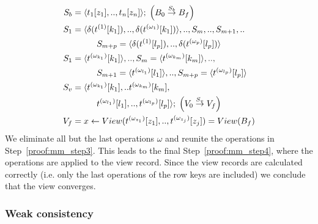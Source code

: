 \begin{subequations}
  \begin{align}
  S_b&=\langle t_1[z_1],..,t_n[z_n]\rangle;\;\Big(B_0 \overset{S_b}{\rightarrow}B_f\Big)\label{proof:mm_step1}\\ 
 S_1&=\langle \delta(t^{(1)}[k_{1}]),..,\delta(t^{(\omega_1)}[k_{1}])\rangle,..,S_m,..,S_{m+1},..\label{proof:mm_step2}\\ 
&\hspace{10 mm}S_{m+p}=\langle \delta(t^{(1)}[l_{p}]),..,\delta(t^{(\omega_p)}[l_{p}])\rangle\notag\\
  S_1&=\langle t^{(\omega_{k_1})}[k_{1}]\rangle,.., S_m=\langle t^{(\omega_{k_m})}[k_{m}]\rangle,..,\\
 &\hspace{10 mm}S_{m+1}=\langle t^{(\omega_{l_1})}[l_{1}]\rangle,..,S_{m+p}=\langle t^{(\omega_{l_p})}[l_{p}]\rangle\notag\\
 S_v&=\langle t^{(\omega_{k_1})}[k_{1}],..t^{(\omega_{k_m})}[k_{m}],\\
 &\hspace{10 mm}t^{(\omega_{l_1})}[l_{1}],..,t^{(\omega_{l_p})}[l_{p}] \rangle;\;\Big(V_0\overset{S_v}{\rightarrow}V_f\Big)\label{proof:mm_step3}\\
 	V_f&=x\leftarrow View(t^{(\omega_{z_1})}[z_1],.., t^{(\omega_{z_j})}[z_j])=View(B_f)\label{proof:mm_step4}
  \end{align}
\end{subequations}
%
We eliminate all but the last operations $\omega$ and reunite the 
operations in Step~\ref{proof:mm_step3}. This leads to the final 
Step~\ref{proof:mm_step4}, where the operations are applied to the view 
record. Since the view records are calculated correctly (i.e. only the 
last operations of the row keys are included) we conclude that the view 
converges. 

\subsubsection{Weak consistency} 
\label{sub:proof_weak}

